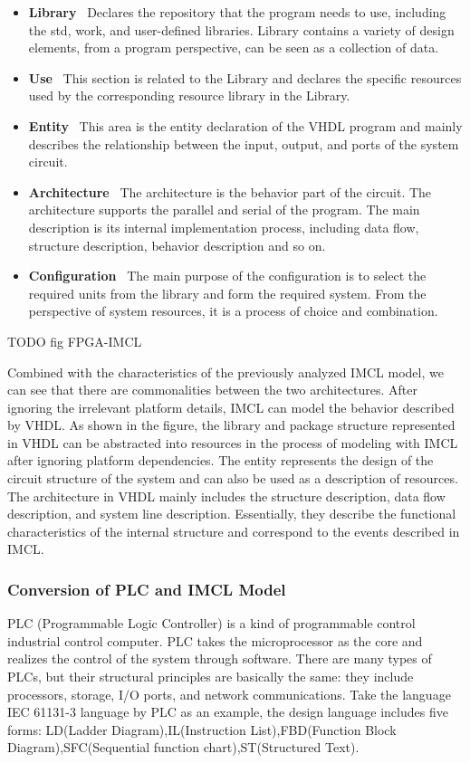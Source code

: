 \begin{itemize}
\item \textbf{Library} \ Declares the repository that the program needs to use, including the std, work, and user-defined libraries. Library contains a variety of design elements, from a program perspective, can be seen as a collection of data.
\item \textbf{Use} \ This section is related to the Library and declares the specific resources used by the corresponding resource library in the Library.
\item \textbf{Entity} \ This area is the entity declaration of the VHDL program and mainly describes the relationship between the input, output, and ports of the system circuit.
\item \textbf{Architecture} \ The architecture is the behavior part of the circuit. The architecture supports the parallel and serial of the program. The main description is its internal implementation process, including data flow, structure description, behavior description and so on.
\item \textbf{Configuration} \ The main purpose of the configuration is to select the required units from the library and form the required system. From the perspective of system resources, it is a process of choice and combination.
\end{itemize}

TODO fig FPGA-IMCL

Combined with the characteristics of the previously analyzed IMCL model, we can see that there are commonalities between the two architectures. After ignoring the irrelevant platform details, IMCL can model the behavior described by VHDL. As shown in the figure, the library and package structure represented in VHDL can be abstracted into resources in the process of modeling with IMCL after ignoring platform dependencies. The entity represents the design of the circuit structure of the system and can also be used as a description of resources. The architecture in VHDL mainly includes the structure description, data flow description, and system line description. Essentially, they describe the functional characteristics of the internal structure and correspond to the events described in IMCL.


\subsubsection{\textbf{Conversion of PLC and IMCL Model}}
PLC (Programmable Logic Controller) is a kind of programmable control industrial control computer. PLC takes the microprocessor as the core and realizes the control of the system through software. There are many types of PLCs, but their structural principles are basically the same: they include processors, storage, I/O ports, and network communications. Take the language IEC 61131-3 language by PLC as an example, the design language includes five forms: LD(Ladder Diagram),IL(Instruction List),FBD(Function Block Diagram),SFC(Sequential function chart),ST(Structured Text).

